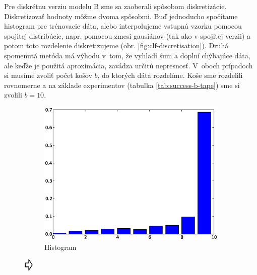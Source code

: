 Pre diskrétnu verziu modelu B sme sa zaoberali spôsobom diskretizácie.
Diskretizovať hodnoty môžme dvoma spôsobmi. Buď jednoducho spočítame histogram pre trénovacie dáta, alebo interpolujeme vstupnú vzorku pomocou spojitej distribúcie, napr. pomocou zmesi gausiánov (tak ako v spojitej verzii) a potom toto rozdelenie diskretizujeme (obr. \ref{fig:clf-discretisation}). Druhá spomenutá metóda má výhodu v~tom, že vyhladí šum a doplní chýbajúce dáta, ale keďže je použitá aproximácia, zavádza určitú nepresnosť.
V~oboch prípadoch si musíme zvoliť počet košov $b$, do ktorých dáta rozdelíme. Koše sme rozdelili rovnomerne a na základe experimentov (tabuľka \ref{tab:success-b-tape}) sme si zvolili $b = 10$.

\begin{figure}[htp]
        \centering
        \begin{subfigure}[c]{0.3\textwidth}
                \includegraphics[width=\textwidth]{images/hist1}
                \caption{Histogram}
                \label{fig:clf-discretisation-1}
        \end{subfigure}%
        $\vcenter{\hbox{\raisebox{.8cm}{\Huge\pointer}}}$
        \begin{subfigure}[c]{0.3\textwidth}

\end{subfigure}
\end{figure}
